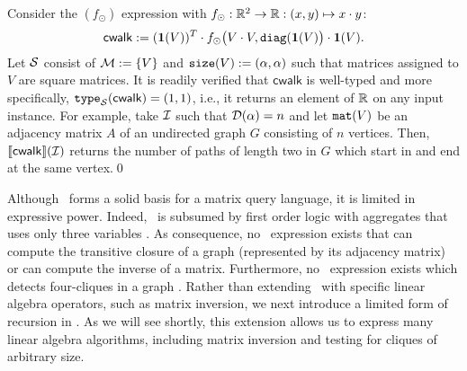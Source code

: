 \begin{example}Consider the \lang$(f_\odot)$ expression with $f_\odot:\mathbb{R}^2\to\mathbb{R}:(x,y)\mapsto x\cdot y$:
$$\mathsf{cwalk}:= (\mathbf{1}(V))^T\cdot f_{\odot}\bigl(V\cdot V, \texttt{diag}(\mathbf{1}(V)\bigr)\cdot\mathbf{1}(V).$$
Let $\mathcal{S}$  consist of $\mathcal{M}:=\{V\}$ and $\texttt{size}(V):=(\alpha,\alpha)$ such that
matrices assigned to $V$ are square matrices.
It is readily verified that $\mathsf{cwalk}$ is well-typed and more specifically, $\texttt{type}_{\mathcal{S}}(\mathsf{cwalk})=(1,1)$, i.e., it returns an element of $\mathbb{R}$ on any input instance.
For example, take $\mathcal{I}$ such that $\mathcal{D}(\alpha)=n$ and let $\texttt{mat}(V)$ be an adjacency matrix $A$ of an undirected graph $G$ consisting of $n$ vertices. Then, $\llbracket \mathsf{cwalk} \rrbracket(\mathcal{I})$ returns the number of paths of length two in $G$ which start in and end at the same vertex.\qed
\end{example}
Although \lang\ forms a solid basis for a matrix query language, it is limited in expressive power. Indeed, \lang\ is subsumed by first order logic with aggregates that uses only three variables \cite{matlang}. As consequence, no \lang\ expression exists that can compute the transitive closure of a graph (represented by its adjacency matrix) or can compute the inverse of a matrix. Furthermore, no \lang\ expression exists which detects four-cliques in a graph \cite{matlang}. Rather than extending \lang\ with specific linear algebra operators, such as matrix inversion, we next introduce a limited form of recursion in \lang.
As we will see shortly, this extension allows us to express many linear algebra algorithms, including matrix inversion and testing for cliques of arbitrary size.


%
%
%

